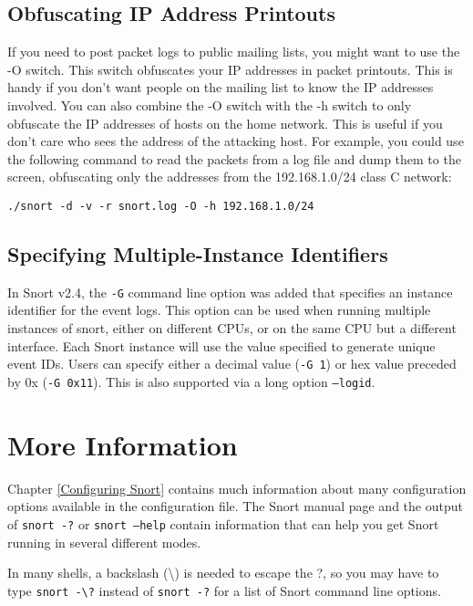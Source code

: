 \documentclass[english]{report}
\newenvironment{note}{
\samepage
    \vspace{10pt}{\textsf{
        {\hspace{7pt}\Huge{$\triangle$\hspace{-12.5pt}{\Large{$^!$}}}}\hspace{5pt}
        {\Large{NOTE}}
    }
    }
   \begin{center}
    \par\vspace{-17pt}

    \begin{lrbox}{\savepar}
    \begin{minipage}[r]{6in}
}
{
    \end{minipage}
    \end{lrbox}
    \fbox{
        \usebox{
            \savepar
	}
    }
    \par\vskip10pt
    \end{center}
}
\begin{document}
\subsection{Obfuscating IP Address Printouts}

If you need to post packet logs to public mailing lists, you might
want to use the -O switch. This switch obfuscates your IP addresses in
packet printouts. This is handy if you don't want people on the mailing
list to know the IP addresses involved. You can also combine the -O switch with
the -h switch to only obfuscate the IP addresses of hosts on the home network.
This is useful if you don't care who sees the address of the attacking host.
For example, you could use the following command to read the packets from a log 
file and dump them to the screen, obfuscating only the addresses from the 
192.168.1.0/24 class C network:
 
\begin{center}
\begin{verbatim}
./snort -d -v -r snort.log -O -h 192.168.1.0/24
\end{verbatim}
\end{center}

\subsection{Specifying Multiple-Instance Identifiers}

In Snort v2.4, the \texttt{-G} command line option was added that specifies
an instance identifier for the event logs.  This option can be used when
running multiple instances of snort, either on different CPUs, or on the same
CPU but a different interface.  Each Snort instance will use the value
specified to generate unique event IDs.  Users can specify either a
decimal value (\texttt{-G 1}) or hex value preceded by 0x (\texttt{-G 0x11}).
This is also supported via a long option \texttt{--logid}.

\section{More Information}

Chapter \ref{Configuring Snort} contains much information about many
configuration options available in the configuration file.  The Snort manual
page and the output of \texttt{snort -?} or \texttt{snort --help} contain
information that can help you get Snort running in several different modes.

\begin{note}
In many shells, a backslash (\textbackslash{}) is needed to escape the ?, so you may have to type 
\texttt{snort -\textbackslash{}?} instead of \texttt{snort -?} for a list of Snort command line options.
\end{note}
\end{document}

